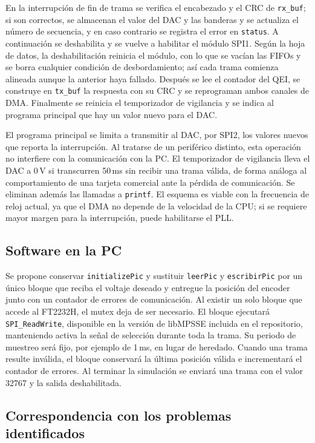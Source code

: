 \documentclass[11pt]{article}
\newcommand{\code}[1]{\texttt{#1}}
\begin{document}
En la interrupción de fin de trama se verifica el encabezado y el CRC de
\code{rx\_buf}; si son correctos, se almacenan el valor del DAC y las banderas
y se actualiza el número de secuencia, y en caso contrario se registra el
error en \code{status}. A continuación se deshabilita y se vuelve a habilitar
el módulo SPI1. Según la hoja de datos, la deshabilitación reinicia el módulo,
con lo que se vacían las FIFOs y se borra cualquier condición de
desbordamiento; así cada trama comienza alineada aunque la anterior haya
fallado. Después se lee el contador del QEI, se construye en \code{tx\_buf} la
respuesta con su CRC y se reprograman ambos canales de DMA. Finalmente se
reinicia el temporizador de vigilancia y se indica al programa principal que
hay un valor nuevo para el DAC.

El programa principal se limita a transmitir al DAC, por SPI2, los valores
nuevos que reporta la interrupción. Al tratarse de un periférico distinto, esta
operación no interfiere con la comunicación con la PC. El temporizador de
vigilancia lleva el DAC a 0\,V si transcurren 50\,ms sin recibir una trama
válida, de forma análoga al comportamiento de una tarjeta comercial ante la
pérdida de comunicación. Se eliminan además las llamadas a \code{printf}. El
esquema es viable con la frecuencia de reloj actual, ya que el DMA no depende
de la velocidad de la CPU; si se requiere mayor margen para la interrupción,
puede habilitarse el PLL.

\subsection{Software en la PC}

Se propone conservar \code{initializePic} y sustituir \code{leerPic} y
\code{escribirPic} por un único bloque que reciba el voltaje deseado y entregue
la posición del encoder junto con un contador de errores de comunicación. Al
existir un solo bloque que accede al FT2232H, el mutex deja de ser necesario.
El bloque ejecutará \code{SPI\_ReadWrite}, disponible en la versión de
libMPSSE incluida en el repositorio, manteniendo activa la señal de selección
durante toda la trama. Su periodo de muestreo será fijo, por ejemplo de 1\,ms,
en lugar de heredado. Cuando una trama resulte inválida, el bloque conservará
la última posición válida e incrementará el contador de errores. Al terminar la
simulación se enviará una trama con el valor 32767 y la salida deshabilitada.

\subsection{Correspondencia con los problemas identificados}
\end{document}
